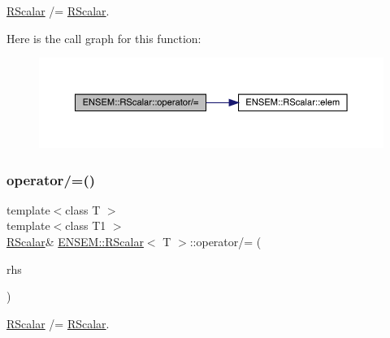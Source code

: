 \mbox{\hyperlink{classENSEM_1_1RScalar}{R\+Scalar}} /= \mbox{\hyperlink{classENSEM_1_1RScalar}{R\+Scalar}}. 

Here is the call graph for this function\+:
\nopagebreak
\begin{figure}[H]
\begin{center}
\leavevmode
\includegraphics[width=350pt]{d0/d8c/classENSEM_1_1RScalar_a8d8cc49d7fed142b93c987c653465000_cgraph}
\end{center}
\end{figure}
\mbox{\label{classENSEM_1_1RScalar_a8d8cc49d7fed142b93c987c653465000}} 
\subsubsection{\texorpdfstring{operator/=()}{operator/=()}\hspace{0.1cm}{\footnotesize\ttfamily [3/3]}}
{\footnotesize\ttfamily template$<$class T $>$ \\
template$<$class T1 $>$ \\
\mbox{\hyperlink{classENSEM_1_1RScalar}{R\+Scalar}}\& \mbox{\hyperlink{classENSEM_1_1RScalar}{E\+N\+S\+E\+M\+::\+R\+Scalar}}$<$ T $>$\+::operator/= (\begin{DoxyParamCaption}\item[{const \mbox{\hyperlink{classENSEM_1_1RScalar}{R\+Scalar}}$<$ T1 $>$ \&}]{rhs }\end{DoxyParamCaption})\hspace{0.3cm}{\ttfamily [inline]}}



\mbox{\hyperlink{classENSEM_1_1RScalar}{R\+Scalar}} /= \mbox{\hyperlink{classENSEM_1_1RScalar}{R\+Scalar}}. 

